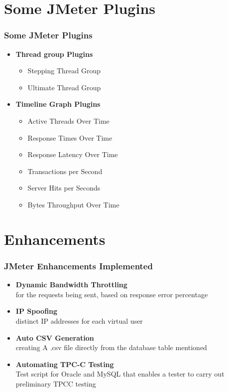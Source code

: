 \documentclass[12pt]{beamer}
\begin{document}
\section{Some JMeter Plugins}
\begin{frame}[c]
\frametitle{Some JMeter Plugins}
  \begin{itemize}
    \item \textbf{Thread group Plugins}
	\begin{itemize}
	\item Stepping Thread Group
	\item Ultimate Thread Group
	\end{itemize}
   \item \textbf{Timeline Graph Plugins}
	\begin{itemize}
	\item Active Threads Over Time
	\item Response Times Over Time
	\item Response Latency Over Time
	\item Transactions per Second
	\item Server Hits per Seconds
	\item Bytes Throughput Over Time
	\end{itemize}
  \end{itemize}
\end{frame}

\section{Enhancements}
\begin{frame}[c]
\frametitle{JMeter Enhancements Implemented}
	\begin{itemize}
	 \item<+-|alert@+> \textbf{Dynamic Bandwidth Throttling}\\
	  for the requests being sent, based on response error percentage
	 \item<+-|alert@+> \textbf{IP Spoofing}\\
	  distinct IP addresses for each virtual user
	\item<+-|alert@+> \textbf{Auto CSV Generation}\\
	  creating A .csv file directly from the database table mentioned
	\item<+-|alert@+> \textbf{Automating TPC-C Testing}\\
	  Test script for Oracle and MySQL that enables a tester to carry out preliminary TPCC testing
	\end{itemize}
\end{frame}
\end{document}
